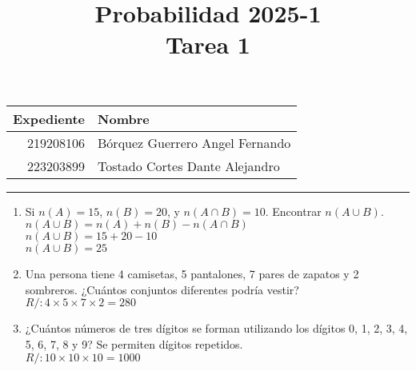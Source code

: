 \documentclass[a4paper, 12pt]{article}
\title{%
  Probabilidad 2025-1 \\
  Tarea 1
}
\begin{document}
\maketitle

\begin{center}
    \begin{tabular}{r|l}
        \textbf{Expediente} & \textbf{Nombre} \\ \hline
        219208106 & Bórquez Guerrero Angel Fernando \\
        223203899 & Tostado Cortes Dante Alejandro \\
    \end{tabular}
\end{center}

\rule{\linewidth}{0.3mm}

\begin{enumerate}
    \item Si $n(A) = 15$, $n(B) = 20$, y $n(A \cap B) = 10$. Encontrar $n(A \cup B).$
    \\ { \color{azul} $n(A \cup B) = n(A) + n(B) - n(A \cap B)$ }
    \\ { \color{azul} $n(A \cup B) = 15 + 20 - 10$ }
    \\ { \color{azul} $n(A \cup B) = 25$ }

    \vspace{0.5cm}
    \item Una persona tiene 4 camisetas, 5 pantalones, 7 pares de zapatos y 2 sombreros. ¿Cuántos conjuntos diferentes podría vestir?
    \\ { \color{azul} $R/: 4 \times 5 \times 7 \times 2 = 280$ }

    \vspace{0.5cm}
    \item ¿Cuántos números de tres dígitos se forman utilizando los dígitos 0, 1, 2, 3, 4, 5, 6, 7, 8 y 9? Se permiten dígitos repetidos.
    \\ { \color{azul}$R/: 10 \times 10 \times 10 = 1000$ } 
\end{enumerate}
\end{document}
